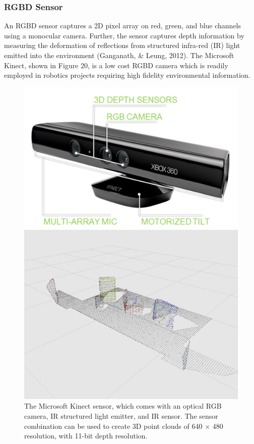 \documentclass[a4paper]{article}
\begin{document}
\newpage

\subsubsection{RGBD Sensor}
An RGBD sensor captures a 2D pixel array on red, green, and blue channels using a monocular camera. Further, the sensor captures depth information by measuring the deformation of reflections from structured infra-red (IR) light emitted into the environment (Ganganath, \& Leung, 2012). The Microsoft Kinect, shown in Figure 20, is a low cost RGBD camera which is readily employed in robotics projects requiring high fidelity environmental information.
\begin{figure}[h]
\centering
\begin{minipage}{0.45\textwidth}
\centering
\includegraphics[scale=0.6]{kinect}
\caption{The Microsoft Kinect sensor, which comes with an optical RGB camera, IR structured light emitter, and IR sensor. The sensor combination can be used to create 3D point clouds of 640 $\times$ 480 resolution, with 11-bit depth resolution.}
\end{minipage}
\hspace{1cm}
\begin{minipage}{0.45\textwidth}
\centering
\includegraphics[scale=0.25]{kinect_voxel_ds}

\end{minipage}
\end{figure}
\end{document}
